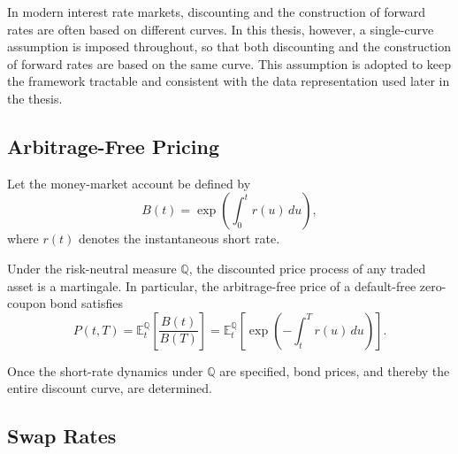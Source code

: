 In modern interest rate markets, discounting and the construction of forward rates are often based on different curves. In this thesis, however, a single-curve assumption is imposed throughout, so that both discounting and the construction of forward rates are based on the same curve. This assumption is adopted to keep the framework tractable and consistent with the data representation used later in the thesis.

\subsection{Arbitrage-Free Pricing}

Let the money-market account be defined by
\begin{equation}
B(t)
=
\exp\!\left(
\int_0^t r(u)\,du
\right),
\label{eq:bank_account}
\end{equation}
where $r(t)$ denotes the instantaneous short rate.

Under the risk-neutral measure $\mathbb{Q}$, the discounted price process of any traded asset is a martingale. In particular, the arbitrage-free price of a default-free zero-coupon bond satisfies
\begin{equation}
P(t,T)
=
\mathbb{E}_t^{\mathbb{Q}}
\left[
\frac{B(t)}{B(T)}
\right]
=
\mathbb{E}_t^{\mathbb{Q}}
\left[
\exp\!\left(
-\int_t^T r(u)\,du
\right)
\right].
\label{eq:riskneutral_bond}
\end{equation}


Once the short-rate dynamics under $\mathbb{Q}$ are specified, bond prices, and thereby the entire discount curve, are determined.



\subsection{Swap Rates}

